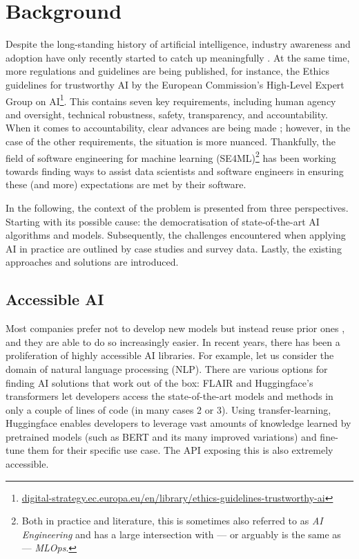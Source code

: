 \chapter{Background} \label{chapter:background}

Despite the long-standing history of artificial intelligence, industry awareness and adoption have only recently started to catch up meaningfully \cite{wirtz2019artificial}. At the same time, more regulations and guidelines are being published, for instance, the Ethics guidelines for trustworthy AI by the European Commission's High-Level Expert Group on AI\footnote{\href{https://digital-strategy.ec.europa.eu/en/library/ethics-guidelines-trustworthy-ai}{digital-strategy.ec.europa.eu/en/library/ethics-guidelines-trustworthy-ai}}. This contains seven key requirements, including human agency and oversight, technical robustness, safety, transparency, and accountability. When it comes to accountability, clear advances are being made \cite{raji2020closing}; however, in the case of the other requirements, the situation is more nuanced. Thankfully, the field of software engineering for machine learning (SE4ML)\footnote{Both in practice and literature, this is sometimes also referred to as \textit{AI Engineering} and has a large intersection with --- or arguably is the same as --- \textit{MLOps}.} has been working towards finding ways to assist data scientists and software engineers in ensuring these (and more) expectations are met by their software.

In the following, the context of the problem is presented from three perspectives. Starting with its possible cause: the democratisation of state-of-the-art AI algorithms and models. Subsequently, the challenges encountered when applying AI in practice are outlined by case studies and survey data. Lastly, the existing approaches and solutions are introduced.

\section{Accessible AI} \label{section:accessible-ai}

Most companies prefer not to develop new models but instead reuse prior ones \cite{bosch2021engineering}, and they are able to do so increasingly easier. In recent years, there has been a proliferation of highly accessible AI libraries. For example, let us consider the domain of natural language processing (NLP). There are various options for finding AI solutions that work out of the box: FLAIR \cite{akbik2019flair} and Huggingface's transformers \cite{wolf2019huggingface} let developers access the state-of-the-art models and methods in only a couple of lines of code (in many cases 2 or 3). Using transfer-learning, Huggingface enables developers to leverage vast amounts of knowledge learned by pretrained models (such as BERT \cite{devlin2018bert} and its many improved variations) and fine-tune them for their specific use case. The API exposing this is also extremely accessible.

